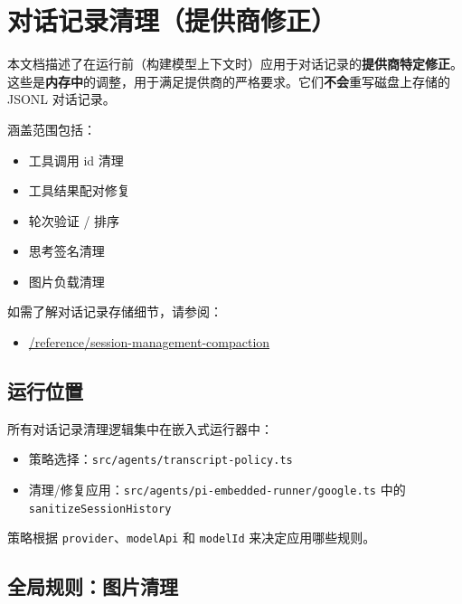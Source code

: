\clearpage

\section{对话记录清理（提供商修正）}


本文档描述了在运行前（构建模型上下文时）应用于对话记录的\textbf{提供商特定修正}。这些是\textbf{内存中}的调整，用于满足提供商的严格要求。它们\textbf{不会}重写磁盘上存储的 JSONL 对话记录。

涵盖范围包括：

\begin{itemize}
  \item 工具调用 id 清理
  \item 工具结果配对修复
  \item 轮次验证 / 排序
  \item 思考签名清理
  \item 图片负载清理
\end{itemize}


如需了解对话记录存储细节，请参阅：

\begin{itemize}
  \item \href{/reference/session-management-compaction}{/reference/session-management-compaction}
\end{itemize}


\hrulefill


\subsection{运行位置}


所有对话记录清理逻辑集中在嵌入式运行器中：

\begin{itemize}
  \item 策略选择：\texttt{src/agents/transcript-policy.ts}
  \item 清理/修复应用：\texttt{src/agents/pi-embedded-runner/google.ts} 中的 \texttt{sanitizeSessionHistory}
\end{itemize}


策略根据 \texttt{provider}、\texttt{modelApi} 和 \texttt{modelId} 来决定应用哪些规则。

\hrulefill


\subsection{全局规则：图片清理}


